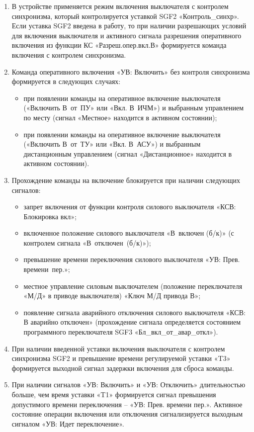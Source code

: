 \begin{enumerate}
\begin{enumerate}
\item
В устройстве применяется режим включения выключателя с контролем синхронизма, который контролируется уставкой SGF2 «Контроль\_синхр». Если уставка SGF2 введена в работу, то при наличии разрешающих условий для включения выключателя и активного сигнала разрешения оперативного включения из функции КС «Разреш.опер.вкл.В» формируется команда включения с контролем синхронизма.

\item
Команда оперативного включения «УВ: Включить» без контроля синхронизма формируется в следующих случаях:
\begin{itemize}
	\item при появлении команды на оперативное включение выключателя («Включить В~от~ПУ» или «Вкл. В~ИЧМ») и выбранным управлением по месту (сигнал «Местное» находится в активном состоянии);
	\item при появлении команды на оперативное включение выключателя («Включить В~от~ТУ» или «Вкл. В~АСУ») и выбранным дистанционным управлением (сигнал «Дистанционное» находится в активном состоянии).
\end{itemize}

\item
Прохождение команды на включение блокируется при наличии следующих сигналов:
\begin{itemize}
	\item запрет включения от функции контроля силового выключателя «КСВ: Блокировка вкл»;
	\item включенное положение силового выключателя «В~включен (б/к)» (с контролем сигнала «В~отключен~(б/к)»);
	\item превышение времени переключения силового выключателя «УВ: Прев. времени~пер.»;
	\item местное управление силовым выключателем (положение переключателя «М/Д» в приводе выключателя) «Ключ М/Д привода В»;
	\item появление сигнала аварийного отключения силового выключателя «КСВ: В аварийно отключен» (прохождение сигнала определяется состоянием программного переключателя SGF3 «Бл\_вкл\_от\_авар\_откл»).
\end{itemize}

\item  
При наличии введенной уставки включения выключателя с контролем синхронизма SGF2 и превышение времени регулируемой уставки «T3» формируется выходной сигнал задержки включения для сброса команды.

\item
При наличии сигналов «УВ: Включить» и «УВ: Отключить» длительностью больше, чем время уставки «T1» формируется сигнал превышения допустимого времени переключения -- «УВ: Прев. времени пер.». Активное состояние операции включения или отключения сигнализируется выходным сигналом «УВ: Идет переключение».


\end{enumerate}
\end{enumerate}
